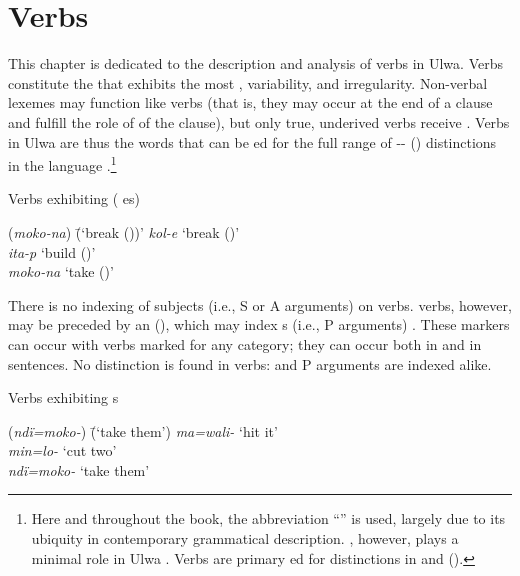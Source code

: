 \chapter{Verbs}\label{sec:4}


This chapter is dedicated to the description and analysis of verbs in Ulwa. Verbs constitute the  that exhibits the most , variability, and irregularity. Non-verbal lexemes may function like verbs (that is, they may occur at the end of a clause and fulfill the role of  of the clause), but only true, underived verbs receive . Verbs in Ulwa are thus the words that can be ed for the full range of -- () distinctions in the language .\footnote{Here and throughout the book, the abbreviation “” is used, largely due to its ubiquity in contemporary grammatical description. , however, plays a minimal role in Ulwa . Verbs are primary ed for distinctions in  and  ().}

\ea%
    \label{ex:verbs:1a}
            Verbs exhibiting  ( es)\\
\begin{tabbing}
{(\textit{moko-na})} \= {(‘break ())}’\kill
\textit{kol-e} \> {‘break ()’}\\
\textit{ita-p} \> {‘build ()’}\\
\textit{moko-na} \> {‘take ()’}
\end{tabbing}
 \z

  There is no  indexing of subjects (i.e., S or A arguments) on verbs.  verbs, however, may be preceded by an   (), which may index s (i.e., P arguments) . These markers can occur with verbs marked for any  category; they can occur both in  and in  sentences. No  distinction is found in verbs:  and  P arguments are indexed alike.

\ea%
    \label{ex:verbs:1b}
            Verbs exhibiting  s\\
\begin{tabbing}
{(\textit{ndï=moko-})} \= {(‘take them’)}\kill
{\textit{ma=wali-}} \> {‘hit it’}\\
{\textit{min=lo-}} \> {‘cut two’}\\
{\textit{ndï=moko-}} \> {‘take them’}
\end{tabbing}
 \z

